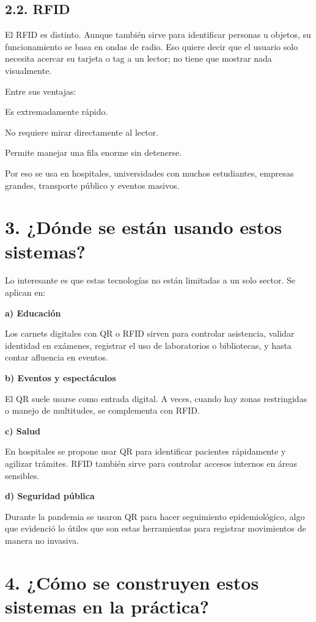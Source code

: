 \documentclass{article}
\begin{document}
\subsection{2.2. RFID}

El RFID es distinto. Aunque también sirve para identificar personas u objetos, su funcionamiento se basa en ondas de radio. Eso quiere decir que el usuario solo necesita acercar su tarjeta o tag a un lector; no tiene que mostrar nada visualmente.

Entre sus ventajas:

Es extremadamente rápido.

No requiere mirar directamente al lector.

Permite manejar una fila enorme sin detenerse.

Por eso se usa en hospitales, universidades con muchos estudiantes, empresas grandes, transporte público y eventos masivos.

\section{3. ¿Dónde se están usando estos sistemas?}

Lo interesante es que estas tecnologías no están limitadas a un solo sector. Se aplican en:

\textbf{a) Educación}

Los carnets digitales con QR o RFID sirven para controlar asistencia, validar identidad en exámenes, registrar el uso de laboratorios o bibliotecas, y hasta contar afluencia en eventos.

\textbf{b) Eventos y espectáculos}

El QR suele usarse como entrada digital. A veces, cuando hay zonas restringidas o manejo de multitudes, se complementa con RFID.

\textbf{c) Salud}

En hospitales se propone usar QR para identificar pacientes rápidamente y agilizar trámites. RFID también sirve para controlar accesos internos en áreas sensibles.

\textbf{d) Seguridad pública}

Durante la pandemia se usaron QR para hacer seguimiento epidemiológico, algo que evidenció lo útiles que son estas herramientas para registrar movimientos de manera no invasiva.

\section{4. ¿Cómo se construyen estos sistemas en la práctica?}
\end{document}
